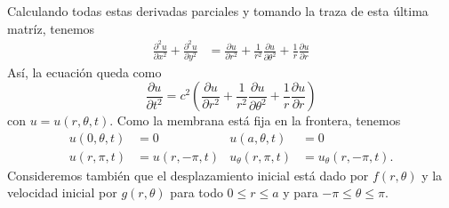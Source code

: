 \documentclass[11pt,letterpaper,draft]{report}
\theoremstyle{plain}
\theoremstyle{definition}
\theoremstyle{remark}
\newcommand\<{\langle}
\renewcommand\>{\rangle}
\begin{document}
Calculando todas estas derivadas parciales
y tomando la traza de esta última matríz, tenemos
\begin{align*}
  \frac{\partial^{2} u}{\partial x^{2}}
  +
  \frac{\partial^{2} u}{\partial y^{2}}
  &=
  \frac{\partial u}{\partial r^{2}}
  +
  \frac{1}{r^{2}}\frac{\partial u}{\partial \theta^{2}}
  +
  \frac{1}{r}\frac{\partial u}{\partial r}
\end{align*}
Así, la ecuación queda como
\[
  \frac{\partial u}{\partial t^{2}}
  =c^{2}
  \left(
    \frac{\partial u}{\partial r^{2}}
    +
    \frac{1}{r^{2}}\frac{\partial u}{\partial \theta^{2}}
    +
    \frac{1}{r}\frac{\partial u}{\partial r}
  \right)
\]
con $u=u(r,\theta,t)$.
Como la membrana está fija en la frontera, tenemos
\begin{align*}
  u(0,\theta,t)&= 0 & u(a,\theta,t)&= 0 \\
  u(r,\pi,t)&=u(r,-\pi,t) & u_\theta(r,\pi,t)&=u_\theta(r,-\pi,t).
\end{align*}
Consideremos también que el desplazamiento inicial está dado por
$f(r,\theta)$ y la velocidad inicial por $g(r,\theta)$ para todo
$0\leq r\leq a$ y para $-\pi\leq\theta\leq\pi$.
\end{document}

